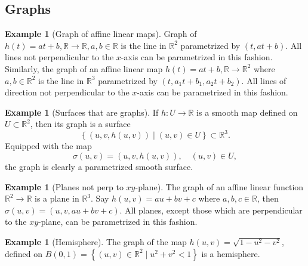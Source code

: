 \documentclass[reqno]{amsart}
\theoremstyle{plain}%
\theoremstyle{definition}
\newtheorem{example}[theorem]{Example}
\theoremstyle{remark}
\begin{document}
\subsection{Graphs}
\begin{example}[Graph of affine linear maps]
    Graph of $h(t) = at+b, \mathbb{R} \to \mathbb{R}, a,b \in \mathbb{R}$ is
    the line in $\mathbb{R}^2$ parametrized by $(t, at+b)$.
    All lines not perpendicular to the $x$-axis can be parametrized in this
    fashion.\\
    Similarly, the graph of an affine linear map $h(t) = at+b, \mathbb{R}
    \to \mathbb{R}^2$ where $a,b \in \mathbb{R}^2$ is the line in
    $\mathbb{R}^3$ parametrized by
    $\left( t, a_1t+b_1, a_2t+b_2 \right) $. All lines of direction not
    perpendicular to the $x$-axis can be parametrized in this fashion.
\end{example}
\begin{example}[Surfaces that are graphs]
    If $h  \colon U \to \mathbb{R}$ is a smooth map defined on
    $U \subset \mathbb{R}^2$, then its graph is a surface
     \[
    \left\{ \left( u,v, h(u,v) \right)  \mid 
    (u,v) \in U \right\} \subset \mathbb{R}^3.
    \] 
    Equipped with the map
    \[
    \sigma (u,v) = \left( u,v,h(u,v) \right) , \quad (u,v) \in U,
    \] 
    the graph is clearly a parametrized smooth surface.
\end{example}
\begin{example}[Planes not perp to $xy$-plane]
    The graph of an affine linear function $\mathbb{R}^2 \to \mathbb{R}$ is
    a plane in $\mathbb{R}^3$. Say $h(u,v) = au+bv +c$ where
    $a,b,c \in \mathbb{R}$, then $\sigma  (u,v) = \left( u,v,
    au + bv + c\right) $. All planes, except those which are perpendicular to
    the $xy$-plane, can be parametrized in this fashion.
\end{example}
\begin{example}[Hemisphere]
    The graph of the map $h(u,v) = \sqrt{1 - u^2 - v^2} $, defined on
    $B(0,1) = \left\{ 
    \left( u,v \right) \in \mathbb{R}^2  \mid 
u^2 + v^2 < 1 \right\} $ is a hemisphere.
\end{example}
\end{document}
